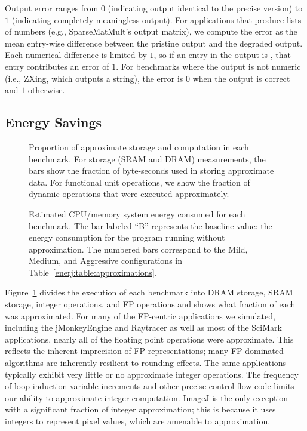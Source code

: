Output error ranges from $0$ (indicating output identical to the
precise version) to $1$ (indicating completely meaningless output). For
applications that produce lists of numbers (e.g., SparseMatMult's output
matrix), we compute the error as the mean entry-wise difference between the
pristine output and the degraded output. Each numerical difference is limited
by $1$, so if an entry in the output is ,
that entry contributes an error of $1$. For benchmarks where the output is not
numeric (i.e., ZXing, which outputs a string), the error is $0$ when the output
is correct and $1$ otherwise. %


\subsection{Energy Savings}

\begin{figure}
\center
\sffamily

\caption{Proportion of approximate storage and computation in each benchmark.
For storage (SRAM and DRAM) measurements, the bars
show the fraction of byte-seconds used in storing approximate data.
For functional unit operations, we show the fraction of dynamic operations
that were executed approximately.}
\label{enerj:fig:approximateness}
\end{figure}

\begin{figure}
\center
\sffamily

\caption{Estimated CPU/memory system energy consumed for
each benchmark. The bar labeled ``B'' represents the baseline value:
the energy consumption for the program running without approximation.
The numbered bars correspond to the Mild, Medium, and Aggressive
configurations in Table~\ref{enerj:table:approximations}.}
\label{enerj:fig:energy}
\end{figure}

Figure~\ref{enerj:fig:approximateness} divides the execution of each
benchmark into DRAM storage, SRAM storage, integer operations, and FP
operations and shows what fraction of each was approximated. For
many of the FP-centric applications we simulated, including the
jMonkeyEngine and Raytracer as well as most of the SciMark
applications, nearly all of the floating point operations were
approximate. This reflects the inherent imprecision of FP
representations; many FP-dominated algorithms are inherently resilient
to rounding effects.
The same applications typically exhibit very little or no
approximate integer operations. The frequency of loop induction
variable increments and other precise control-flow code limits our
ability to approximate integer computation. ImageJ is the only
exception with a significant fraction of integer approximation; this is
because it uses integers to represent pixel values, which are amenable
to approximation.

